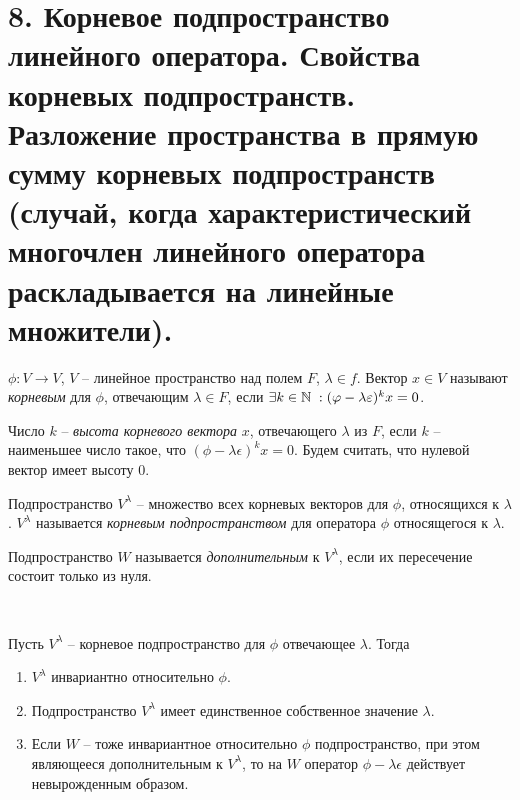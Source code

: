 \section{8. Корневое подпространство линейного оператора. Свойства корневых подпространств. Разложение пространства в прямую сумму корневых подпространств (случай, когда характеристический многочлен линейного оператора раскладывается на линейные множители).}

\begin{definition}
    $\phi : V \to V$, $V$ -- линейное пространство над полем $F$, $\lambda \in f$.
    Вектор $x \in V$ называют \textit{корневым} для $\phi$, отвечающим $\lambda \in F$, если 
    $\exists k \in \mathbb{N} \; : (\varphi - \lambda \varepsilon)^{k}x = 0$.
\end{definition}

\begin{definition}
    Число $k$ -- \textit{высота корневого вектора} $x$, отвечающего $\lambda$ из $F$, если $k$ -- наименьшее 
    число такое, что $(\phi - \lambda \epsilon)^k x = 0$. 
    Будем считать, что нулевой вектор имеет высоту 0.
\end{definition}

\begin{definition}
    Подпространство $ V^{\lambda}$ -- множество всех корневых векторов для $\phi$, относящихся к $\lambda$. $ V^{\lambda}$ называется \textit{корневым подпространством} для оператора $\phi$ относящегося к $\lambda$.
\end{definition}

\begin{definition}
    Подпространство $W$ называется \textit{дополнительным} к $V^{\lambda}$, 
    если их пересечение состоит только из нуля.
\end{definition}

\begin{theorem}~
    \label{th5.1}

    Пусть $V^{\lambda}$ -- корневое подпространство для $\phi$ отвечающее $\lambda$. Тогда
    \begin{enumerate}
        \item $V^{\lambda}$ инвариантно относительно $\phi$.
        \item Подпространство $V^{\lambda}$ имеет единственное собственное значение $\lambda$.
        \item Если $W$ -- тоже инвариантное относительно $\phi$ подпространство, при этом являющееся 
        дополнительным к $V^{\lambda}$, то на $W$ оператор 
        $\phi - \lambda \epsilon$ действует невырожденным образом.
    \end{enumerate} 
\end{theorem}

